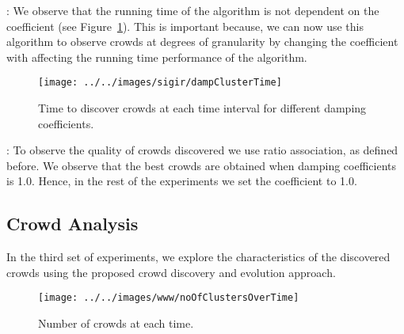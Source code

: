 \documentclass{sig-alternate}
\begin{document}

\medskip{}: We observe that the running time of the algorithm
is not dependent on the coefficient (see Figure~\ref{fig:damp-cluster-time}). This is important because, we can now use
this algorithm to observe crowds at degrees of granularity by changing the
coefficient with affecting the running time performance of the algorithm.

\begin{figure}[!t]
\begin{center}
\texttt{[image: ../../images/sigir/dampClusterTime]}
\caption{Time to discover crowds at each time interval for different
damping coefficients.}
\label{fig:damp-cluster-time}
\end{center}
\end{figure}

\medskip{}: To observe the quality of crowds discovered we use ratio association, as defined before. We observe that the best crowds are obtained when damping coefficients is 1.0. Hence, in the rest of the experiments we set the coefficient to 1.0.



\subsection{Crowd Analysis}
In the third set of experiments, we explore the characteristics of the discovered crowds using the proposed crowd discovery and evolution approach. 



\begin{figure}[!t]
\begin{center}
\texttt{[image: ../../images/www/noOfClustersOverTime]}
\caption{Number of crowds at each time.}
\label{fig:no-of-clusters-time}
\end{center}
\end{figure}
\end{document}

